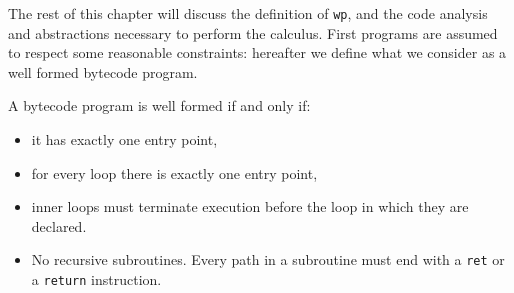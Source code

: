 The rest of this chapter will discuss the definition of \texttt{wp}, and the code analysis and abstractions necessary to perform the calculus.
First programs are assumed to respect some reasonable constraints: hereafter we define what we consider as a well formed bytecode program.
\begin{defn} A bytecode program is well formed if and only if:
\begin{itemize}
\item it has exactly one entry point,
\item for every loop there is exactly one entry point,
\item inner loops must terminate execution before the loop in which they are declared.
\item No recursive subroutines.  Every path in a subroutine must end with a \texttt{ret} or a \texttt{return} instruction. 

\end{itemize}
\label{wf}
\end{defn}
